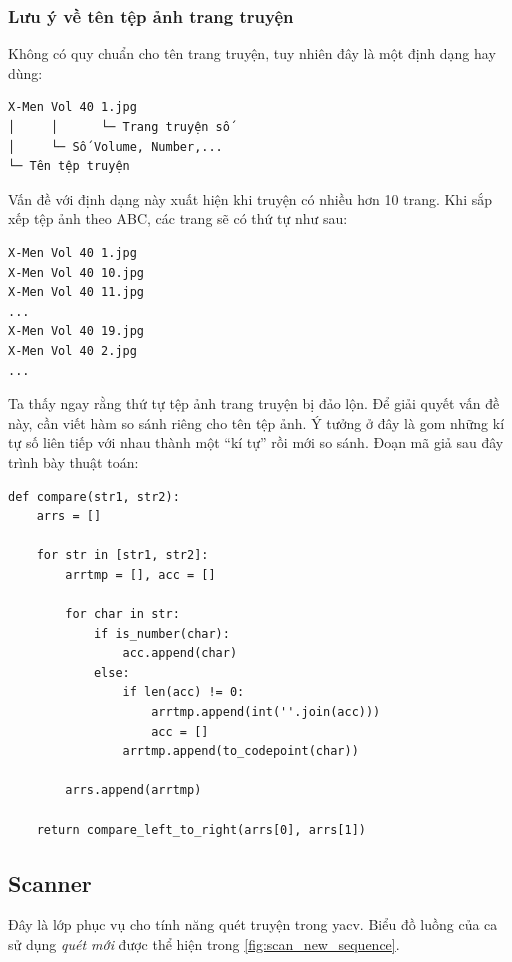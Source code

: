 \documentclass[../../../../thesis]{subfiles}
\begin{document}
\subsubsection{Lưu ý về tên tệp ảnh trang truyện}

Không có quy chuẩn cho tên trang truyện, tuy nhiên đây là một định dạng hay
dùng:

\begin{verbatim}
X-Men Vol 40 1.jpg
│     │      └─ Trang truyện số
│     └─ Số Volume, Number,...
└─ Tên tệp truyện
\end{verbatim}

Vấn đề với định dạng này xuất hiện khi truyện có nhiều hơn 10 trang. Khi sắp xếp
tệp ảnh theo ABC, các trang sẽ có thứ tự như sau:

\begin{verbatim}
X-Men Vol 40 1.jpg
X-Men Vol 40 10.jpg
X-Men Vol 40 11.jpg
...
X-Men Vol 40 19.jpg
X-Men Vol 40 2.jpg
...
\end{verbatim}

Ta thấy ngay rằng thứ tự tệp ảnh trang truyện bị đảo lộn. Để giải quyết vấn đề
này, cần viết hàm so sánh riêng cho tên tệp ảnh. Ý tưởng ở đây là gom những kí
tự số liên tiếp với nhau thành một ``kí tự'' rồi mới so sánh. Đoạn mã giả sau
đây trình bày thuật toán:

\begin{Verbatim}
def compare(str1, str2):
    arrs = []

    for str in [str1, str2]:
        arrtmp = [], acc = []

        for char in str:
            if is_number(char):
                acc.append(char)
            else:
                if len(acc) != 0:
                    arrtmp.append(int(''.join(acc)))
                    acc = []
                arrtmp.append(to_codepoint(char))

        arrs.append(arrtmp)

    return compare_left_to_right(arrs[0], arrs[1])
\end{Verbatim}



\subsection{Scanner}

Đây là lớp phục vụ cho tính năng quét truyện trong yacv. Biểu đồ luồng của ca sử
dụng \emph{quét mới} được thể hiện trong \autoref{fig:scan_new_sequence}.
\end{document}
